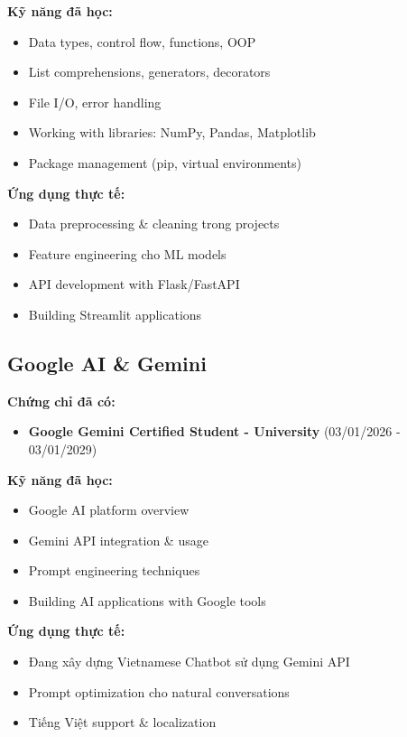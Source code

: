 \documentclass[12pt,a4paper]{article}
\begin{document}
\textbf{Kỹ năng đã học:}
\begin{itemize}
    \item Data types, control flow, functions, OOP
    \item List comprehensions, generators, decorators
    \item File I/O, error handling
    \item Working with libraries: NumPy, Pandas, Matplotlib
    \item Package management (pip, virtual environments)
\end{itemize}

\textbf{Ứng dụng thực tế:}
\begin{itemize}
    \item Data preprocessing \& cleaning trong projects
    \item Feature engineering cho ML models
    \item API development with Flask/FastAPI
    \item Building Streamlit applications
\end{itemize}

\subsection{Google AI \& Gemini}

\textbf{Chứng chỉ đã có:}
\begin{itemize}
    \item \textbf{Google Gemini Certified Student - University} (03/01/2026 - 03/01/2029)
\end{itemize}

\textbf{Kỹ năng đã học:}
\begin{itemize}
    \item Google AI platform overview
    \item Gemini API integration \& usage
    \item Prompt engineering techniques
    \item Building AI applications with Google tools
\end{itemize}

\textbf{Ứng dụng thực tế:}
\begin{itemize}
    \item Đang xây dựng Vietnamese Chatbot sử dụng Gemini API
    \item Prompt optimization cho natural conversations
    \item Tiếng Việt support \& localization
\end{itemize}
\end{document}
